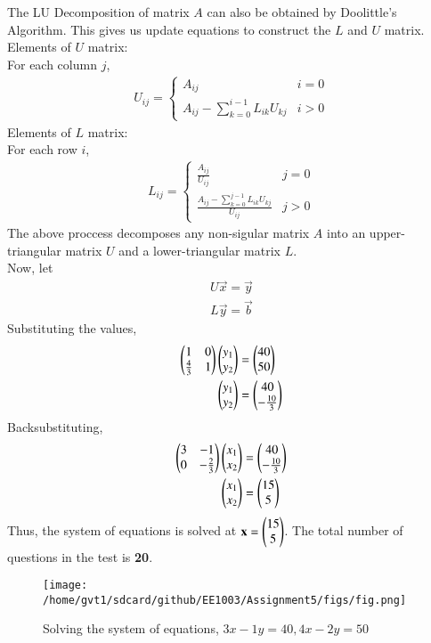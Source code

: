 \documentclass[journal]{IEEEtran}
\begin{document}
The LU Decomposition of matrix $A$ can also be obtained by Doolittle's Algorithm. This gives us update equations to construct the $L$ and $U$ matrix. \\
Elements of $U$ matrix:\\
For each column $j$,
\begin{align}
  U_{ij} = \begin{cases}
    A_{ij} & i=0 \\
    A_{ij} - \sum _{k=0}^{i-1} L_{ik}U_{kj} & i>0
  \end{cases}
\end{align}
Elements of $L$ matrix:\\
For each row $i$,
\begin{align}
  L_{ij} = \begin{cases}
    \frac{A_{ij}}{U_{ij}} & j=0 \\
    \frac{A_{ij} - \sum _{k=0}^{j-1} L_{ik}U_{kj}}{U_{ij}} & j>0
  \end{cases}
\end{align}
The above proccess decomposes any non-sigular matrix $A$ into an upper-triangular matrix $U$ and a lower-triangular matrix $L$.\\
Now, let
\begin{align}
  U\vec{x} = \vec{y}\\
  L\vec{y} = \vec{b}\label{1}
\end{align}
Substituting the values,
\begin{align}
  \begin{pmatrix}1 & 0 \\ \frac{4}{3} & 1\end{pmatrix}\begin{pmatrix}y_1 \\ y_2\end{pmatrix} &= \begin{pmatrix}40 \\ 50\end{pmatrix}\\
  \begin{pmatrix}y_1 \\ y_2\end{pmatrix} &= \begin{pmatrix}40 \\ -\frac{10}{3}\end{pmatrix}
\end{align}
Backsubstituting,
\begin{align}
  \begin{pmatrix}3 & -1 \\ 0 & -\frac{2}{3}\end{pmatrix}\begin{pmatrix}x_1 \\ x_2\end{pmatrix} &= \begin{pmatrix}40 \\ -\frac{10}{3}\end{pmatrix}\\
  \begin{pmatrix}x_1 \\ x_2\end{pmatrix} &= \begin{pmatrix} 15 \\ 5\end{pmatrix}
\end{align}
Thus, the system of equations is solved at $\mathbf{x} = \begin{pmatrix}15 \\ 5\end{pmatrix}$.
The total number of questions in the test is \textbf{20}.
\begin{figure}[h!]
   \centering
   \texttt{[image: /home/gvt1/sdcard/github/EE1003/Assignment5/figs/fig.png]}
   \caption{Solving the system of equations, $3x - 1y = 40, 4x - 2y = 50$}
\end{figure}
\end{document}
